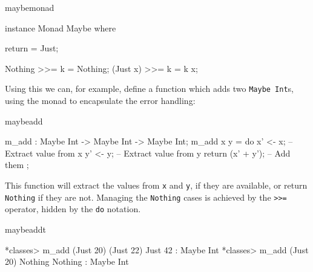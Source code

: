 \begin{SaveVerbatim}{maybemonad}

instance Monad Maybe where {
    return = Just;

    Nothing  >>= k = Nothing;
    (Just x) >>= k = k x;
}

\end{SaveVerbatim}

\noindent
Using this we can, for example, define a function which adds two 
\texttt{Maybe Int}s, using the monad to encapsulate the error handling:

\begin{SaveVerbatim}{maybeadd}

m_add : Maybe Int -> Maybe Int -> Maybe Int;
m_add x y = do { x' <- x; -- Extract value from x
                 y' <- y; -- Extract value from y
                 return (x' + y'); -- Add them 
               };

\end{SaveVerbatim}

\noindent
This function will extract the values from \texttt{x} and \texttt{y}, if they
are available, or return \texttt{Nothing} if they are not. Managing the
\texttt{Nothing} cases is achieved by the \texttt{>>=} operator, hidden by the
\texttt{do} notation.

\begin{SaveVerbatim}{maybeaddt}

*classes> m_add (Just 20) (Just 22) 
Just 42 : Maybe Int
*classes> m_add (Just 20) Nothing 
Nothing : Maybe Int

\end{SaveVerbatim}
